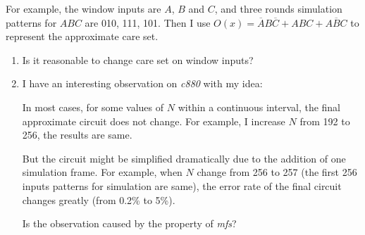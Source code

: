 \documentclass{rpt}
\begin{document}
For example, the window inputs are $A$, $B$ and $C$, and three rounds simulation patterns for $ABC$ are 010, 111, 101.
Then I use $O(x) = \overline AB \overline C + ABC + A \overline B C$ to represent the approximate care set.

\begin{enumerate}
\item Is it reasonable to change care set on window inputs?
\item I have an interesting observation on \textit{c880} with my idea:

In most cases, for some values of $N$ within a continuous interval,
the final approximate circuit does not change.
For example,
I increase $N$ from 192 to 256, the results are same.

But the circuit might be simplified dramatically due to the addition of one simulation frame.
For example, when $N$ change from 256 to 257 (the first 256 inputs patterns for simulation are same), the error rate of the final circuit changes greatly (from 0.2\% to 5\%).

Is the observation caused by the property of \textit{mfs}?
\end{enumerate}
\end{document}
